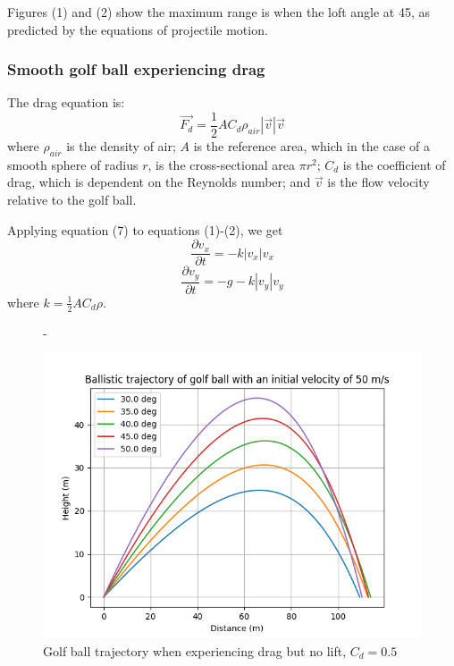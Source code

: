 \documentclass[12pt]{article}
\begin{document}
Figures (1) and (2) show the maximum range is when the loft angle at 45\degree, as predicted by the equations of projectile motion.
\pagebreak
\subsubsection{Smooth golf ball experiencing drag}
The drag equation is:
\begin{equation}
\vec{F_d} = \frac{1}{2} A C_d \rho_{air} |\vec{v}| \vec{v}
\end{equation}
where $\rho_{air}$ is the density of air; $A$ is the reference area, which in the case of a smooth sphere of radius $r$, is the cross-sectional area $\pi r^2$; $C_d$ is the coefficient of drag, which is dependent on the Reynolds number; and $\vec{v}$ is the flow velocity relative to the golf ball.

Applying equation (7) to equations (1)-(2), we get
\begin{equation}
\frac{\partial v_x}{\partial t}=-k |v_x| v_x
\end{equation}
\begin{equation}
\frac{\partial v_y}{\partial t}=-g-k |v_y| v_y
\end{equation}
where $k=\frac{1}{2} A C_d \rho$.
\begin{figure}[H]
\centering
-\caption{Golf ball trajectory when experiencing drag but no lift, $C_d=0.5$}
\includegraphics[scale=0.85]{dragapprox}
\end{figure}
\end{document}

